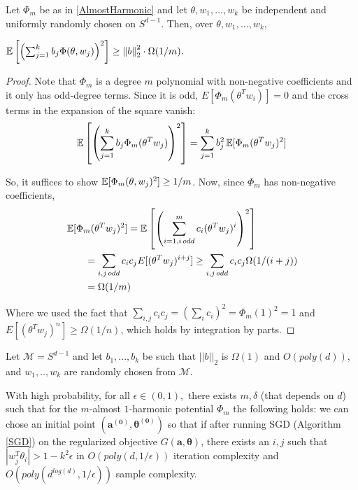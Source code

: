 \begin{lemma}\label{largeVariance}
  Let $\Phi_m$ be as in \ref{AlmostHarmonic}  and let $\theta, w_1,...,w_k$ be
  independent and uniformly randomly chosen on $S^{d-1}$. Then, over
  $\theta, w_1,...,w_k$,
 
 $\operatorname*{\mathbb{E}}\left[\left(  \sum_{j=1}^k b_j \Phi(\theta,w_j)\right)^2\right]
 \geq \left\lVert b \right\rVert_2^2 \cdot \Omega(1/m).$
\end{lemma}
%
\begin{proof}
Note that $\Phi_m$ is a degree $m$ polynomial with non-negative coefficients and it only has odd-degree terms. Since it is odd, $E[\Phi_m(\theta^Tw_i)] = 0$ and the cross terms in the expansion of the square vanish:
%
\[ \operatorname*{\mathbb{E}}\left[\left(  \sum_{j=1}^k b_j
     \Phi_m(\theta^Tw_j)\right)^2\right] = \sum_{j=1}^k b_j^2 \operatorname*{\mathbb{E}}[\Phi_m(\theta^Tw_j)^2]\]

So, it suffices to show $\operatorname*{\mathbb{E}}[\Phi_m(\theta,w_j)^2] \geq 1/m$.  Now, since $\Phi_m$ has non-negative coefficients,
\begin{align*}
& \operatorname*{\mathbb{E}}[\Phi_m(\theta^Tw_j)^2] = \operatorname*{\mathbb{E}}\left[\left(\sum_{i=1, i \,
                               odd}^m c_i
                               (\theta^Tw_j)^i\right)^2\right] \\
& \qquad = \sum_{i,j \,odd} c_ic_j E[(\theta^Tw_j)^{i+j}] \geq \sum_{i,j
  \,odd}c_i c_j \Omega(1/(i+j))  \\
& \qquad =\Omega(1/m) 
\end{align*}

Where we used the fact that
$\sum_{i,j} c_ic_j = (\sum_i c_i)^2 = \Phi_m(1)^2 = 1$ and
$E[(\theta^Tw_j)^{n}] \geq \Omega(1/n)$, which holds by integration by
parts. 
\end{proof}

\begin{theorem}
  Let $\mathcal{M} = S^{d-1}$ and let $b_1,...,b_k$ be such that
  $||b||_2$ is $\Omega(1)$ and $O(poly(d))$, and $w_1,..,w_k$ are
  randomly chosen from $\mathcal{M}$.  
  
  With high probability, for all $\epsilon \in (0,1),$ there exists $m, \delta$ (that depends on $d$) such that for the $m$-almost $1$-harmonic potential $\Phi_m$ the
  following holds: we can chose an initial point $(\boldsymbol{a^{(0)}, \theta^{(0)}})$ so that if after running SGD (Algorithm \ref{SGD}) on the regularized objective
  $G(\boldsymbol{a,\theta})$, there exists an $i, j$ such that $|w_j^T\theta_i| > 1- k^2\epsilon$ in $O(poly(d,1/\epsilon))$ iteration complexity and $O(poly(d^{log(d)},1/\epsilon))$ sample complexity.
\end{theorem}

